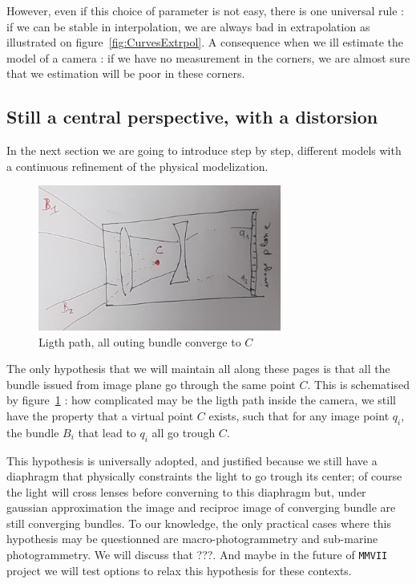 However, even if this choice of parameter is not easy, there is
one universal rule : if we can be stable in interpolation, we are always bad in extrapolation
as illustrated on figure~\ref{fig:CurvesExtrpol}. A 
consequence when we ill estimate the model of a camera : if we have no measurement in the corners,
we are almost sure that we estimation will be poor in these corners.

\subsection{Still a central perspective, with a distorsion}
\label{Still:Persp}

In the next section we are going to introduce step by step, different models with a continuous
refinement of the physical modelization.  

\begin{figure}
\centering
	\includegraphics[width=8cm]{Methods/Images/CamPersp.jpg}
	\caption{Ligth path, all outing bundle converge to $C$}
	\label{fig:CamPerspScheme}
\end{figure}

The only hypothesis that we will maintain all along these pages is that all the bundle issued from image
plane go through the same point $C$. This is schematised by figure~\ref{fig:CamPerspScheme} :
how complicated may be the ligth path inside the camera, we still have the property that
a virtual point $C$ exists, such that for any image point $q_i$, the bundle $B_i$ that lead to $q_i$
all go trough $C$.

This hypothesis is universally adopted, and justified because we still have a diaphragm that physically constraints
the light to go trough its center; of course the light will cross lenses before converning to this diaphragm but,
under gaussian approximation the image and reciproc image of converging bundle are still converging bundles.
To our knowledge, the only practical cases where this hypothesis may be questionned are macro-photogrammetry and
sub-marine photogrammetry. We will discuss that ???. And maybe in the future of {\tt MMVII} project we will 
test options to relax this hypothesis for these contexts.

